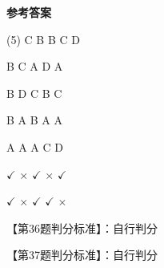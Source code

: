 \documentclass[11pt, a4paper]{article}
\begin{document}
\begin{center}
    \Huge \textbf{参考答案}
\end{center}

    \begin{tasks}[label=\arabic*. , label-width=14pt](5)
        \task C
        \task B
        \task B
        \task C
        \task D

        \task B
        \task C
        \task A
        \task D
        \task A

        \task B
        \task D
        \task C
        \task B
        \task C

        \task B
        \task A
        \task B
        \task A
        \task A

        \task A
        \task A
        \task A
        \task C
        \task D

        \task $\checkmark$
        \task $\times$
        \task $\checkmark$
        \task $\times$
        \task $\checkmark$

        \task $\checkmark$
        \task $\times$
        \task $\checkmark$
        \task $\checkmark$
        \task $\times$
    \end{tasks}

    【第36题判分标准】：自行判分

    【第37题判分标准】：自行判分
\end{document}
